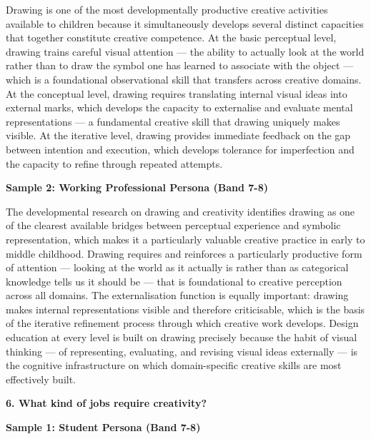 Drawing is one of the most developmentally productive creative activities available to children because it simultaneously develops several distinct capacities that together constitute creative competence. At the basic perceptual level, drawing trains careful visual attention — the ability to actually look at the world rather than to draw the symbol one has learned to associate with the object — which is a foundational observational skill that transfers across creative domains. At the conceptual level, drawing requires translating internal visual ideas into external marks, which develops the capacity to externalise and evaluate mental representations — a fundamental creative skill that drawing uniquely makes visible. At the iterative level, drawing provides immediate feedback on the gap between intention and execution, which develops tolerance for imperfection and the capacity to refine through repeated attempts.

\textbf{Sample 2: Working Professional Persona (Band 7-8)}

The developmental research on drawing and creativity identifies drawing as one of the clearest available bridges between perceptual experience and symbolic representation, which makes it a particularly valuable creative practice in early to middle childhood. Drawing requires and reinforces a particularly productive form of attention — looking at the world as it actually is rather than as categorical knowledge tells us it should be — that is foundational to creative perception across all domains. The externalisation function is equally important: drawing makes internal representations visible and therefore criticisable, which is the basis of the iterative refinement process through which creative work develops. Design education at every level is built on drawing precisely because the habit of visual thinking — of representing, evaluating, and revising visual ideas externally — is the cognitive infrastructure on which domain-specific creative skills are most effectively built.

\separator

\begin{ieltsquestion}
\textbf{6. What kind of jobs require creativity?}
\end{ieltsquestion}
\textbf{Sample 1: Student Persona (Band 7-8)}

